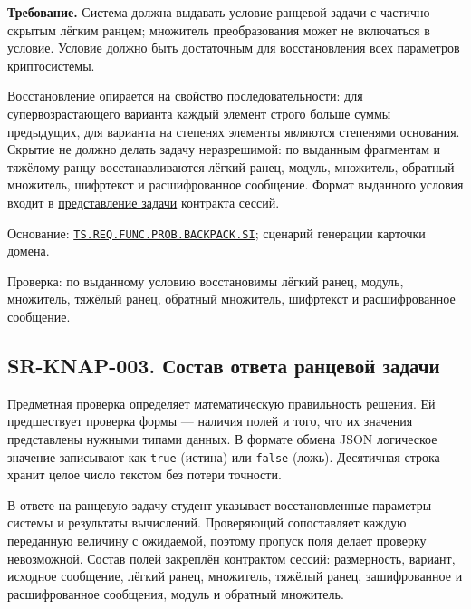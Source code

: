 \documentclass[12pt,a4paper]{article}
\begin{document}
\textbf{Требование.} Система должна выдавать условие ранцевой задачи с частично скрытым лёгким ранцем; множитель преобразования может не включаться в условие. Условие должно быть достаточным для восстановления всех параметров криптосистемы.

Восстановление опирается на свойство последовательности: для супервозрастающего варианта каждый элемент строго больше суммы предыдущих, для варианта на степенях элементы являются степенями основания. Скрытие не должно делать задачу неразрешимой: по выданным фрагментам и тяжёлому ранцу восстанавливаются лёгкий ранец, модуль, множитель, обратный множитель, шифртекст и расшифрованное сообщение. Формат выданного условия входит в {\href{../07\_Программные\_требования/DOC-06.2\_Сессии\_задач\_и\_планировщик.pdf\#представление-сессии-и-задачи}{представление задачи}} контракта сессий.

Основание: {\href{../02\_Техническое\_задание/Техническое\_задание.pdf\#ts-req-func-prob-backpack-si}{\texttt{TS.\allowbreak{}REQ.\allowbreak{}FUNC.\allowbreak{}PROB.\allowbreak{}BACKPACK.\allowbreak{}SI}}}; сценарий генерации карточки домена.

Проверка: по выданному условию восстановимы лёгкий ранец, модуль, множитель, тяжёлый ранец, обратный множитель, шифртекст и расшифрованное сообщение.

\subsection{SR-KNAP-003. Состав ответа ранцевой задачи}\label{sr-knap-003-ux441ux43eux441ux442ux430ux432-ux43eux442ux432ux435ux442ux430-ux440ux430ux43dux446ux435ux432ux43eux439-ux437ux430ux434ux430ux447ux438}

\hypertarget{sr-knap-003-состав-ответа-ранцевой-задачи}{}

\hypertarget{sr-knap-003}{}

Предметная проверка определяет математическую правильность решения. Ей предшествует проверка формы --- наличия полей и того, что их значения представлены нужными типами данных. В формате обмена JSON логическое значение записывают как \texttt{true} (истина) или \texttt{false} (ложь). Десятичная строка хранит целое число текстом без потери точности.

В ответе на ранцевую задачу студент указывает восстановленные параметры системы и результаты вычислений. Проверяющий сопоставляет каждую переданную величину с ожидаемой, поэтому пропуск поля делает проверку невозможной. Состав полей закреплён {\href{../07\_Программные\_требования/DOC-06.2\_Сессии\_задач\_и\_планировщик.pdf\#ранцевая-задача}{контрактом сессий}}: размерность, вариант, исходное сообщение, лёгкий ранец, множитель, тяжёлый ранец, зашифрованное и расшифрованное сообщения, модуль и обратный множитель.
\end{document}
